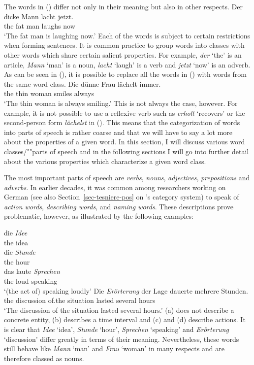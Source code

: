 The words in () differ not only in their meaning but also in other respects.
\ea
\gll Der dicke Mann lacht jetzt.\\
	 the fat man laughs now\\
\glt `The fat man is laughing now.'
\z
Each of the words is subject to certain restrictions when forming sentences. It is common practice to group words into classes with
other words which share certain salient properties. For example, \emph{der} `the' is an article, \emph{Mann} `man' is a noun,
\emph{lacht} `laugh' is a verb and \emph{jetzt} `now' is an adverb. As can
be seen in (), it is possible to replace all the words
in () with words from the same word class.
\ea
\gll Die dünne Frau lächelt immer.\\
	 the thin woman smiles always\\
\glt `The thin woman is always smiling.'
\z
This is not always the case, however. For example, it is not possible to use a reflexive verb such as \emph{erholt} `recovers' or the second-person form
\emph{lächelst} in (). This means that the categorization of words into parts of speech is
rather coarse and that we will have to say a lot more about the properties of a given word. In this
section, I will discuss various word classes/""parts of speech and in the following sections I will
go into further detail about the various properties which characterize a given word class.

The most important parts of speech are \emph{verbs}, \emph{nouns},
\emph{adjectives}, \emph{prepositions} and
\emph{adverbs}. In earlier decades, it was common among researchers working on German
(see also Section~\ref{sec-tesniere-pos} on \tes's category system) to speak of \emph{action words},
\emph{describing words}, and \emph{naming words}. These descriptions prove problematic, however, as
illustrated by the following examples:


\eal
\ex 
\gll die \emph{Idee}\\
	the idea\\
\ex 
\gll die \emph{Stunde}\\
	 the hour\\
\ex 
\gll das laute \emph{Sprechen}\\
     the loud speaking\\
\glt `(the act of) speaking loudly'
\ex 
\gll Die \emph{Erörterung} der Lage dauerte mehrere Stunden.\\
     the discussion of.the situation lasted several hours\\
\glt `The discussion of the situation lasted several hours.'
\zl
(a) does not describe a concrete entity, (b) describes a time interval and (c) and (d)
describe actions. It is clear that \emph{Idee} `idea', \emph{Stunde} `hour', \emph{Sprechen}
`speaking' and \emph{Erörterung} `discussion' differ greatly in terms of their
meaning. Nevertheless, these words still behave like \emph{Mann} `man' and \emph{Frau} `woman' in many respects
and are therefore classed as nouns.

